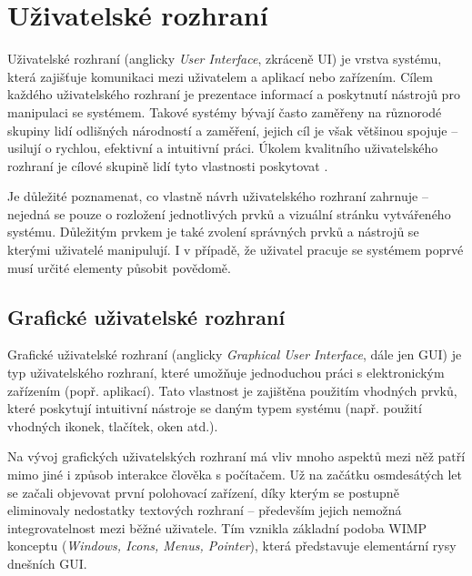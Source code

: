 \chapter{Uživatelské rozhraní}
\label{chap:ui}

Uživatelské rozhraní (anglicky \textit{User Interface}, zkráceně UI) je vrstva systému, která zajišťuje komunikaci mezi uživatelem a aplikací nebo zařízením. Cílem každého uživatelského rozhraní je prezentace informací a poskytnutí nástrojů pro manipulaci se systémem. Takové systémy bývají často zaměřeny na různorodé skupiny lidí odlišných národností a zaměření, jejich cíl je však většinou spojuje -- usilují o rychlou, efektivní a intuitivní práci. Úkolem kvalitního uživatelského rozhraní je cílové skupině lidí tyto vlastnosti poskytovat \cite{2}.

Je důležité poznamenat, co vlastně návrh uživatelského rozhraní zahrnuje -- nejedná se pouze o rozložení jednotlivých prvků a vizuální stránku vytvářeného systému. Důležitým prvkem je také zvolení správných prvků a nástrojů se kterými uživatelé manipulují. I v případě, že uživatel pracuje se systémem poprvé musí určité elementy působit povědomě.

\section{Grafické uživatelské rozhraní}
\label{sec:gui}

Grafické uživatelské rozhraní (anglicky \textit{Graphical User Interface}, dále jen GUI) je typ uživatelského rozhraní, které umožňuje jednoduchou práci s elektronickým zařízením (popř. aplikací). Tato vlastnost je zajištěna použitím vhodných prvků, které poskytují intuitivní nástroje se daným typem systému (např. použití vhodných ikonek, tlačítek, oken atd.).

Na vývoj grafických uživatelských rozhraní má vliv mnoho aspektů mezi něž patří mimo jiné i způsob interakce člověka s počítačem. Už na začátku osmdesátých let se začali objevovat první polohovací zařízení, díky kterým se postupně eliminovaly nedostatky textových rozhraní -- především jejich nemožná integrovatelnost mezi běžné uživatele. Tím vznikla základní podoba WIMP konceptu (\textit{Windows, Icons, Menus, Pointer}), která představuje elementární rysy dnešních GUI.

